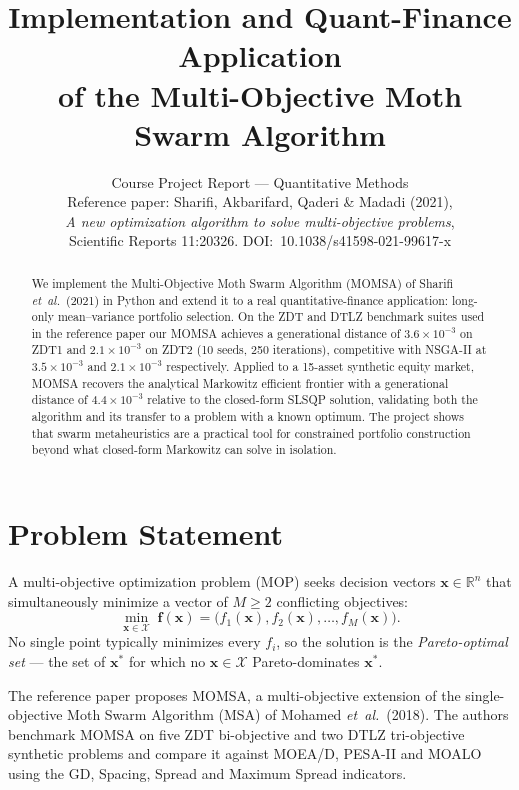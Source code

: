 \documentclass[11pt,a4paper]{article}
\title{\bfseries Implementation and Quant-Finance Application\\
of the Multi-Objective Moth Swarm Algorithm}
\author{Course Project Report --- Quantitative Methods\\
Reference paper: Sharifi, Akbarifard, Qaderi \& Madadi (2021), \\
\textit{A new optimization algorithm to solve multi-objective problems},\\
Scientific Reports 11:20326. DOI:~10.1038/s41598-021-99617-x}
\date{}
\begin{document}
\maketitle

\begin{abstract}
We implement the Multi-Objective Moth Swarm Algorithm (MOMSA) of Sharifi
\textit{et~al.}\ (2021) in Python and extend it to a real
quantitative-finance application: long-only mean--variance portfolio
selection. On the ZDT and DTLZ benchmark suites used in the reference
paper our MOMSA achieves a generational distance of $3.6\times 10^{-3}$
on ZDT1 and $2.1\times 10^{-3}$ on ZDT2 (10 seeds, 250 iterations),
competitive with NSGA-II at $3.5\times 10^{-3}$ and $2.1\times 10^{-3}$
respectively. Applied to a 15-asset synthetic equity market, MOMSA
recovers the analytical Markowitz efficient frontier with a generational
distance of $4.4\times 10^{-3}$ relative to the closed-form SLSQP
solution, validating both the algorithm and its transfer to a problem
with a known optimum. The project shows that swarm metaheuristics are a
practical tool for constrained portfolio construction beyond what
closed-form Markowitz can solve in isolation.
\end{abstract}

\section{Problem Statement}
\label{sec:problem}

A multi-objective optimization problem (MOP) seeks decision vectors
$\mathbf{x} \in \mathbb{R}^n$ that simultaneously minimize a vector of
$M \geq 2$ conflicting objectives:
\begin{equation}
\min_{\mathbf{x} \in \mathcal{X}} \;
\mathbf{f}(\mathbf{x}) = \bigl(f_1(\mathbf{x}), f_2(\mathbf{x}), \ldots, f_M(\mathbf{x})\bigr).
\label{eq:mop}
\end{equation}
No single point typically minimizes every $f_i$, so the solution is the
\emph{Pareto-optimal set} --- the set of $\mathbf{x}^\ast$ for which no
$\mathbf{x} \in \mathcal{X}$ Pareto-dominates $\mathbf{x}^\ast$.

The reference paper proposes MOMSA, a multi-objective extension of the
single-objective Moth Swarm Algorithm (MSA) of Mohamed
\textit{et~al.}\ (2018). The authors benchmark MOMSA on five ZDT
bi-objective and two DTLZ tri-objective synthetic problems and compare
it against MOEA/D, PESA-II and MOALO using the GD, Spacing, Spread and
Maximum Spread indicators.
\end{document}
